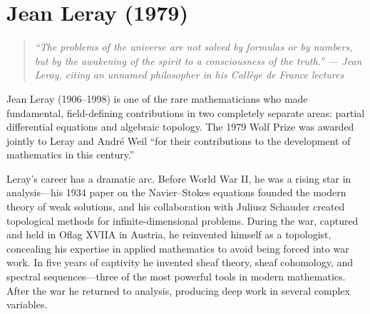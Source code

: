 \let\im\relax
\newcommand{\im}{\operatorname{im}}
\let\coker\relax
\newcommand{\coker}{\operatorname{coker}}
\let\Spec\relax
\newcommand{\Spec}{\operatorname{Spec}}
\let\Supp\relax
\newcommand{\Supp}{\operatorname{Supp}}
\let\sing\relax
\newcommand{\sing}{\operatorname{sing}}
\let\divg\relax
\newcommand{\divg}{\operatorname{div}}
\let\Sh\relax
\newcommand{\Sh}{\operatorname{Sh}}
\let\res\relax
\newcommand{\res}{\operatorname{res}}
\let\N\relax
\newcommand{\N}{\mathbb{N}}
\let\R\relax
\newcommand{\R}{\mathbb{R}}
\let\C\relax
\newcommand{\C}{\mathbb{C}}
\let\Q\relax
\newcommand{\Q}{\mathbb{Q}}
\let\Z\relax
\newcommand{\Z}{\mathbb{Z}}
\let\cF\relax
\newcommand{\cF}{\mathcal{F}}
\let\cG\relax
\newcommand{\cG}{\mathcal{G}}
\let\cU\relax
\newcommand{\cU}{\mathcal{U}}
\let\cV\relax
\newcommand{\cV}{\mathcal{V}}
\let\cO\relax
\newcommand{\cO}{\mathcal{O}}

\chapter{Jean Leray (1979)}

\begin{quote}
\it ``The problems of the universe are not solved by formulas or by numbers, but by the awakening of the spirit to a consciousness of the truth.'' --- Jean Leray, citing an unnamed philosopher in his Coll{\`e}ge de France lectures
\end{quote}

Jean Leray (1906--1998) is one of the rare mathematicians who made fundamental, field-defining contributions in two completely separate areas: partial differential equations and algebraic topology. The 1979 Wolf Prize was awarded jointly to Leray and Andr\'{e} Weil ``for their contributions to the development of mathematics in this century.''

Leray's career has a dramatic arc. Before World War II, he was a rising star in analysis---his 1934 paper on the Navier--Stokes equations founded the modern theory of weak solutions, and his collaboration with Juliusz Schauder created topological methods for infinite-dimensional problems. During the war, captured and held in Oflag XVIIA in Austria, he reinvented himself as a topologist, concealing his expertise in applied mathematics to avoid being forced into war work. In five years of captivity he invented sheaf theory, sheaf cohomology, and spectral sequences---three of the most powerful tools in modern mathematics. After the war he returned to analysis, producing deep work in several complex variables.

